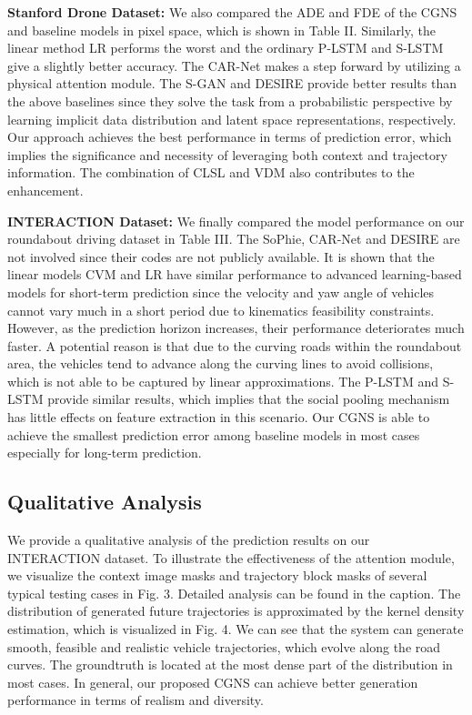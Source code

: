 \documentclass[letterpaper, 10 pt, conference]{ieeeconf}
\begin{document}
\vspace{0.1cm}
\textbf{Stanford Drone Dataset:}  
We also compared the ADE and FDE of the CGNS and baseline models in pixel space, which is shown in Table II.
Similarly, the linear method LR performs the worst and the ordinary P-LSTM and S-LSTM give a slightly better accuracy.
The CAR-Net makes a step forward by utilizing a physical attention module.
The S-GAN and DESIRE provide better results than the above baselines since they solve the task from a probabilistic perspective by learning implicit data distribution and latent space representations, respectively. 
Our approach achieves the best performance in terms of prediction error, which implies the significance and necessity of leveraging both context and trajectory information.
The combination of CLSL and VDM also contributes to the enhancement.

\vspace{0.1cm}
\textbf{INTERACTION Dataset:}
We finally compared the model performance on our roundabout driving dataset in Table III. The SoPhie, CAR-Net and DESIRE are not involved since their codes are not publicly available.
It is shown that the linear models CVM and LR have similar performance to advanced learning-based models for short-term prediction since the velocity and yaw angle of vehicles cannot vary much in a short period due to kinematics feasibility constraints. However, as the prediction horizon increases, their performance deteriorates much faster. 
A potential reason is that due to the curving roads within the roundabout area, the vehicles tend to advance along the curving lines to avoid collisions, which is not able to be captured by linear approximations.
The P-LSTM and S-LSTM provide similar results, which implies that the social pooling mechanism has little effects on feature extraction in this scenario.
Our CGNS is able to achieve the smallest prediction error among baseline models in most cases especially for long-term prediction.


\subsection{Qualitative Analysis}

We provide a qualitative analysis of the prediction results on our INTERACTION dataset.
To illustrate the effectiveness of the attention module, we visualize the context image masks and trajectory block masks of several typical testing cases in Fig. 3. Detailed analysis can be found in the caption.
The distribution of generated future trajectories is approximated by the kernel density estimation, which is visualized in Fig. 4. 
We can see that the system can generate smooth, feasible and realistic vehicle trajectories, which evolve along the road curves. 
The groundtruth is located at the most dense part of the distribution in most cases.
In general, our proposed CGNS can achieve better generation performance in terms of realism and diversity. 
\end{document}
